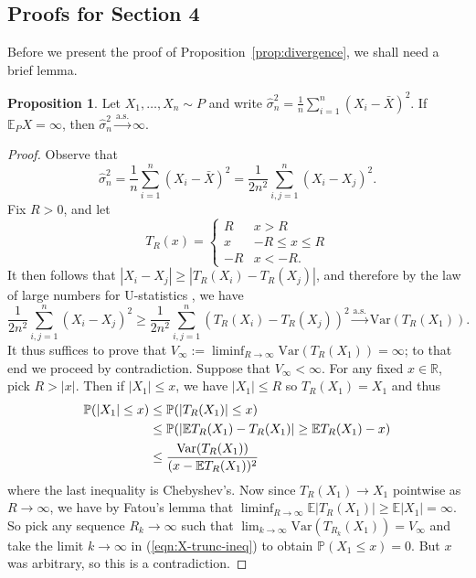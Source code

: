 \documentclass{article}
\theoremstyle{definition}
\newtheorem{proposition}{Proposition}
\newcommand{\R}{\mathbb{R}}
\newcommand{\E}{\mathbb{E}}
\newcommand{\1}{\mathbbm{1}}
\renewcommand{\P}{\mathbb{P}}
\begin{document}
\subsection{Proofs for Section 4}
Before we present the proof of Proposition~\ref{prop:divergence}, we shall need a brief lemma. 
\begin{proposition}
\label{prop:std-divergence}
    Let $X_1, \dots, X_n \sim P$ and write $\hat \sigma_n^2 = \frac1n \sum_{i=1}^n (X_i - \bar X)^2$. If $\E_PX = \infty$, then $\hat \sigma_n^2 \xrightarrow{\mathrm{a.s.}} \infty$.
\end{proposition}
\begin{proof}
    Observe that 
    \[
    \hat \sigma_n^2 = \frac1n\sum_{i=1}^n (X_i - \bar X)^2 = \frac{1}{2n^2} \sum_{i,j=1}^n (X_i - X_j)^2.
    \]
    Fix $R > 0$, and let 
    \[
    T_R(x) = \begin{cases}
        R & x > R \\
        x & -R \leq x \leq R \\
        -R & x < -R.
    \end{cases}
    \]
    It then follows that $|X_i - X_j| \geq |T_R(X_i) - T_R(X_j)|$, and therefore by the law of large numbers for U-statistics \citep{hoeffding1961strong}, we have
    \[
     \frac{1}{2n^2} \sum_{i,j=1}^n (X_i - X_j)^2 \geq \frac{1}{2n^2} \sum_{i,j=1}^n (T_R(X_i) - T_R(X_j))^2 \xrightarrow{\mathrm{a.s.}} \mathrm{Var}(T_R(X_1)).
    \]
    It thus suffices to prove that $V_\infty := \liminf_{R \to \infty} \mathrm{Var}(T_R(X_1)) = \infty$; to that end we proceed by contradiction. Suppose that $V_\infty  < \infty$. For any fixed $x \in \R$, pick $R > |x|$. Then if $|X_1| \leq x$, we have $|X_1| \leq R$ so $T_R(X_1) = X_1$ and thus 
    \begin{align}
        \P(|X_1| \leq x) &\leq  \P(|T_R(X_1)| \leq x) \notag \\ &\leq \P(|\E T_R(X_1)-T_R(X_1)| \geq \E T_R(X_1) - x) \notag\\ & \leq \frac{\mathrm{Var}(T_R(X_1))}{(x - \E T_R(X_1))^2}
        \label{eqn:X-trunc-ineq}
    \end{align}
    where the last inequality is Chebyshev's. Now since $T_R(X_1) \to X_1$ pointwise as $R \to \infty$, we have by Fatou's lemma that $\liminf_{R \to \infty} \E|T_R(X_1)| \geq \E |X_1| = \infty$.
    So pick any sequence $R_k \to \infty$ such that $\lim_{k \to \infty} \mathrm{Var}(T_{R_k}(X_1)) =V_\infty$ and take the limit $k \to \infty$ in (\ref{eqn:X-trunc-ineq}) to obtain $\P(X_1 \leq x) = 0$. But $x$ was arbitrary, so this is a contradiction. 
\end{proof}
\end{document}
